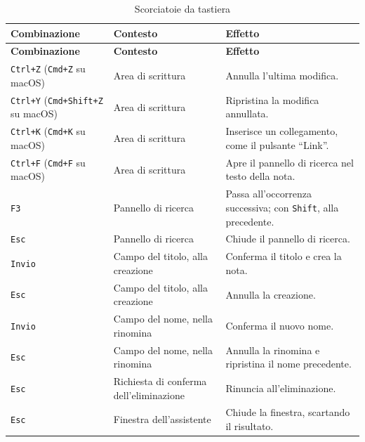 \documentclass[a4paper, 10pt]{article}
\begin{document}
\begingroup
\small
\begin{longtable}{|p{3.6cm}|p{4.2cm}|p{4.5cm}|}
    \caption{Scorciatoie da tastiera}
    \label{tab:scorciatoie} \\
    \hline
    \textbf{Combinazione} & \textbf{Contesto} & \textbf{Effetto} \\
    \hline
    \endfirsthead
    \hline
    \textbf{Combinazione} & \textbf{Contesto} & \textbf{Effetto} \\
    \hline
    \endhead
    \texttt{Ctrl+Z} \newline (\texttt{Cmd+Z} su macOS) & Area di scrittura & Annulla l'ultima modifica. \\ \hline

    \texttt{Ctrl+Y} \newline (\texttt{Cmd+Shift+Z} su macOS) & Area di scrittura & Ripristina la modifica annullata. \\ \hline

    \texttt{Ctrl+K} \newline (\texttt{Cmd+K} su macOS) & Area di scrittura & Inserisce un collegamento, come il pulsante ``Link''. \\ \hline

    \texttt{Ctrl+F} \newline (\texttt{Cmd+F} su macOS) & Area di scrittura & Apre il pannello di ricerca nel testo della nota. \\ \hline

    \texttt{F3} & Pannello di ricerca & Passa all'occorrenza successiva; con \texttt{Shift}, alla precedente. \\ \hline

    \texttt{Esc} & Pannello di ricerca & Chiude il pannello di ricerca. \\ \hline

    \texttt{Invio} & Campo del titolo, alla creazione & Conferma il titolo e crea la nota. \\ \hline

    \texttt{Esc} & Campo del titolo, alla creazione & Annulla la creazione. \\ \hline

    \texttt{Invio} & Campo del nome, nella rinomina & Conferma il nuovo nome. \\ \hline

    \texttt{Esc} & Campo del nome, nella rinomina & Annulla la rinomina e ripristina il nome precedente. \\ \hline

    \texttt{Esc} & Richiesta di conferma dell'eliminazione & Rinuncia all'eliminazione. \\ \hline

    \texttt{Esc} & Finestra dell'assistente & Chiude la finestra, scartando il risultato. \\ \hline

\end{longtable}
\endgroup
\end{document}
